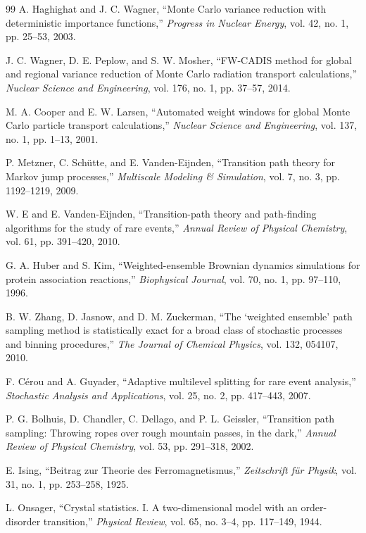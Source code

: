 \documentclass[11pt]{article}
\begin{document}
\begin{thebibliography}{99}
		A. Haghighat and J. C. Wagner, ``Monte Carlo variance reduction with deterministic importance functions,'' \emph{Progress in Nuclear Energy}, vol. 42, no. 1, pp. 25--53, 2003.
		
		J. C. Wagner, D. E. Peplow, and S. W. Mosher, ``FW-CADIS method for global and regional variance reduction of Monte Carlo radiation transport calculations,'' \emph{Nuclear Science and Engineering}, vol. 176, no. 1, pp. 37--57, 2014.
		
		M. A. Cooper and E. W. Larsen, ``Automated weight windows for global Monte Carlo particle transport calculations,'' \emph{Nuclear Science and Engineering}, vol. 137, no. 1, pp. 1--13, 2001.
		
		P. Metzner, C. Sch\"{u}tte, and E. Vanden-Eijnden, ``Transition path theory for Markov jump processes,'' \emph{Multiscale Modeling \& Simulation}, vol. 7, no. 3, pp. 1192--1219, 2009.
		
		W. E and E. Vanden-Eijnden, ``Transition-path theory and path-finding algorithms for the study of rare events,'' \emph{Annual Review of Physical Chemistry}, vol. 61, pp. 391--420, 2010.
		
		G. A. Huber and S. Kim, ``Weighted-ensemble Brownian dynamics simulations for protein association reactions,'' \emph{Biophysical Journal}, vol. 70, no. 1, pp. 97--110, 1996.
		
		B. W. Zhang, D. Jasnow, and D. M. Zuckerman, ``The `weighted ensemble' path sampling method is statistically exact for a broad class of stochastic processes and binning procedures,'' \emph{The Journal of Chemical Physics}, vol. 132, 054107, 2010.
		
		F. C\'{e}rou and A. Guyader, ``Adaptive multilevel splitting for rare event analysis,'' \emph{Stochastic Analysis and Applications}, vol. 25, no. 2, pp. 417--443, 2007.
		
		P. G. Bolhuis, D. Chandler, C. Dellago, and P. L. Geissler, ``Transition path sampling: Throwing ropes over rough mountain passes, in the dark,'' \emph{Annual Review of Physical Chemistry}, vol. 53, pp. 291--318, 2002.
		
		E. Ising, ``Beitrag zur Theorie des Ferromagnetismus,'' \emph{Zeitschrift f\"{u}r Physik}, vol. 31, no. 1, pp. 253--258, 1925.
		
		L. Onsager, ``Crystal statistics. I. A two-dimensional model with an order-disorder transition,'' \emph{Physical Review}, vol. 65, no. 3--4, pp. 117--149, 1944.
		

\end{thebibliography}
\end{document}
